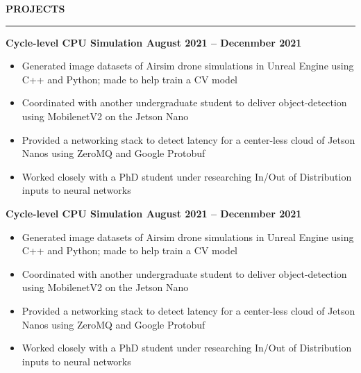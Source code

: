 \documentclass[12pt, a4paper]{article}
\begin{document}
\vspace{0cm}
\textbf{{\fontsize{12}{14}\selectfont PROJECTS}}\newline
\vspace{-0.8cm}\newline
\rule{18.5cm}{0.4pt}
%
%
\noindent\textbf{{\fontsize{12}{14}\selectfont Cycle-level CPU Simulation \hfill August 2021 – Decenmber 2021}}\newline
\vspace{-\topsep}
\begin{itemize}
  \setlength{\itemindent}{-6mm}
  \vspace{-0.2cm}\item Generated image datasets of Airsim drone simulations in Unreal Engine using C++ and Python; made to help train a CV model
  \vspace{-0.2cm}\item Coordinated with another undergraduate student to deliver object-detection using MobilenetV2 on the Jetson Nano
  \vspace{-0.2cm}\item Provided a networking stack to detect latency for a center-less cloud of Jetson Nanos using ZeroMQ and Google Protobuf
  \vspace{-0.2cm}\item Worked closely with a PhD student under researching In/Out of Distribution inputs to neural networks
\end{itemize}
\vspace{0cm}
%
%
\noindent\textbf{{\fontsize{12}{14}\selectfont Cycle-level CPU Simulation \hfill August 2021 – Decenmber 2021}}\newline
\vspace{-\topsep}
\begin{itemize}
  \setlength{\itemindent}{-6mm}
  \vspace{-0.2cm}\item Generated image datasets of Airsim drone simulations in Unreal Engine using C++ and Python; made to help train a CV model
  \vspace{-0.2cm}\item Coordinated with another undergraduate student to deliver object-detection using MobilenetV2 on the Jetson Nano
  \vspace{-0.2cm}\item Provided a networking stack to detect latency for a center-less cloud of Jetson Nanos using ZeroMQ and Google Protobuf
  \vspace{-0.2cm}\item Worked closely with a PhD student under researching In/Out of Distribution inputs to neural networks
\end{itemize}
\end{document}

